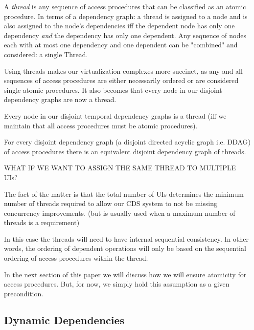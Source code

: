 \begin{con-def}[Thread]
	\label{thread}
	A \textit{thread} is any sequence of access procedures that can be classified as an atomic procedure. In terms of a dependency graph: a thread is assigned to a node and is also assigned to the node's dependencies iff the dependent node has only one dependency \textit{and} the dependency has only one dependent. Any sequence of nodes each with at most one dependency and one dependent can be "combined" and considered: a single Thread.
\end{con-def}

Using threads makes our virtualization complexes more succinct, as any and all sequences of access procedures are either necessarily ordered or are considered single atomic procedures. It also becomes that every node in our disjoint dependency graphs are now a thread.

\begin{props}
	\label{nodes-are-threads}
	Every node in our disjoint temporal dependency graphs is a thread (iff we maintain that all access procedures must be atomic procedures).
\end{props}

\begin{con-cor}
	\label{thread-ddag}
	For every disjoint dependency graph (a disjoint directed acyclic graph i.e. DDAG) of access procedures there is an equivalent disjoint dependency graph of threads.
\end{con-cor}

WHAT IF WE WANT TO ASSIGN THE SAME THREAD TO MULTIPLE UIs? 

The fact of the matter is that the total number of UIs determines the minimum number of threads required to allow our CDS system to not be missing concurrency improvements. (but is usually used when a maximum number of threads is a requirement)

In this case the threads will need to have internal sequential consistency. In other words, the ordering of dependent operations will only be based on the sequential ordering of access procedures within the thread.

In the next section of this paper we will discuss how we will ensure atomicity for access procedures. But, for now, we simply hold this assumption as a given precondition.

\subsection{Dynamic Dependencies}

